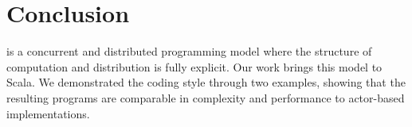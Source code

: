 \section*{Conclusion}
\apgas is a concurrent and distributed programming model where the structure of
computation and distribution is fully explicit. Our work brings this model to
Scala. We demonstrated the coding style through two examples, showing that the
resulting programs are comparable in complexity and performance to actor-based
implementations.
